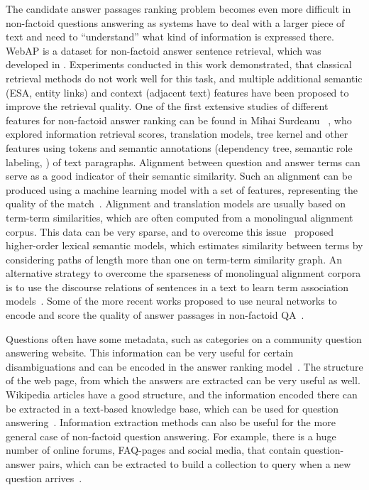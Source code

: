 The candidate answer passages ranking problem becomes even more difficult in non-factoid questions answering as systems have to deal with a larger piece of text and need to ``understand'' what kind of information is expressed there.
WebAP is a dataset for non-factoid answer sentence retrieval, which was developed in \cite{yang2016beyond}.
Experiments conducted in this work demonstrated, that classical retrieval methods do not work well for this task, and multiple additional semantic (ESA, entity links) and context (adjacent text) features have been proposed to improve the retrieval quality.
One of the first extensive studies of different features for non-factoid answer ranking can be found in Mihai Surdeanu \etal~\cite{surdeanu2011learning}, who explored information retrieval scores, translation models, tree kernel and other features using tokens and semantic annotations (dependency tree, semantic role labeling, \etc) of text paragraphs.
Alignment between question and answer terms can serve as a good indicator of their semantic similarity.
Such an alignment can be produced using a machine learning model with a set of features, representing the quality of the match~\cite{wang2015faq}.
Alignment and translation models are usually based on term-term similarities, which are often computed from a monolingual alignment corpus.
This data can be very sparse, and to overcome this issue~\cite{fried2015higher} proposed higher-order lexical semantic models, which estimates similarity between terms by considering paths of length more than one on term-term similarity graph.
An alternative strategy to overcome the sparseness of monolingual alignment corpora is to use the discourse relations of sentences in a text to learn term association models~\cite{sharp2015spinning}.
Some of the more recent works proposed to use neural networks to encode and score the quality of answer passages in non-factoid QA~\cite{cohen2016end,yang2016anmm}.

Questions often have some metadata, such as categories on a community question answering website.
This information can be very useful for certain disambiguations and can be encoded in the answer ranking model~\cite{zhou2015learning}.
The structure of the web page, from which the answers are extracted can be very useful as well.
Wikipedia articles have a good structure, and the information encoded there can be extracted in a text-based knowledge base, which can be used for question answering~\cite{sondhi2014mining}.
Information extraction methods can also be useful for the more general case of non-factoid question answering.
For example, there is a huge number of online forums, FAQ-pages and social media, that contain question-answer pairs, which can be extracted to build a collection to query when a new question arrives~\cite{cong2008finding,ding2008using,Jijkoun:2005:RAF:1099554.1099571,li2011question,Yang:2009:ISK:1526709.1526735}.

